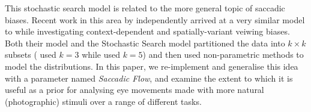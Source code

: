 This stochastic search model is related to the more general topic of saccadic biases. Recent work in this area by \cite{leMeur-coutrot2016} independently arrived at a very similar model to \cite{clarke2016} while investigating context-dependent and spatially-variant veiwing biases. Both their model and the Stochastic Search model partitioned the data into $k\times k$ subsets (\cite{leMeur-coutrot2016} used $k=3$ while \cite{clarke2016} used $k=5$) and then used non-parametric methods to model the distributions. In this paper, we re-implement and generalise this idea with a parameter named \textit{Saccadic Flow}, and examine the extent to which it is useful as a prior for analysing eye movements made with more natural (photographic) stimuli over a range of different tasks. 


\begin{figure}[htb]
\centering
{}

\end{figure}
